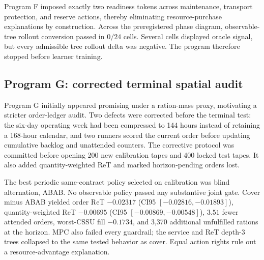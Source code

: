 Program F imposed exactly two readiness tokens across maintenance, transport protection, and
reserve actions, thereby eliminating resource-purchase explanations by construction. Across
the preregistered phase diagram, observable-tree rollout conversion passed in $0/24$ cells.
Several cells displayed oracle signal, but every admissible tree rollout delta was negative.
The program therefore stopped before learner training.

\begin{table}[htbp]
\centering
\caption{Eligibility ladder across the main terminal studies. A dash means the program stopped
before that rung could support a claim.}
\label{tab:eligibility}
\small
{}
\end{table}

\subsection{Program G: corrected terminal spatial audit}

Program G initially appeared promising under a ration-mass proxy, motivating a stricter
order-ledger audit. Two defects were corrected before the terminal test: the six-day operating
week had been compressed to 144 hours instead of retaining a 168-hour calendar, and two
runners scored the current order before updating cumulative backlog and unattended counters.
The corrective protocol was committed before opening 200 new calibration tapes and 400 locked
test tapes. It also added quantity-weighted ReT and marked horizon-pending orders lost.

The best periodic same-contract policy selected on calibration was blind alternation, ABAB.
No observable policy passed any substantive joint gate. Cover minus ABAB yielded order ReT
$-0.02317$ (CI95 $[-0.02816,-0.01893]$), quantity-weighted ReT $-0.00695$
(CI95 $[-0.00869,-0.00548]$), $3.51$ fewer attended orders, worst-CSSU fill $-0.1734$,
and 3,370 additional unfulfilled rations at the horizon. MPC also failed every guardrail; the
service and ReT depth-3 trees collapsed to the same tested behavior as cover. Equal action
rights rule out a resource-advantage explanation.

